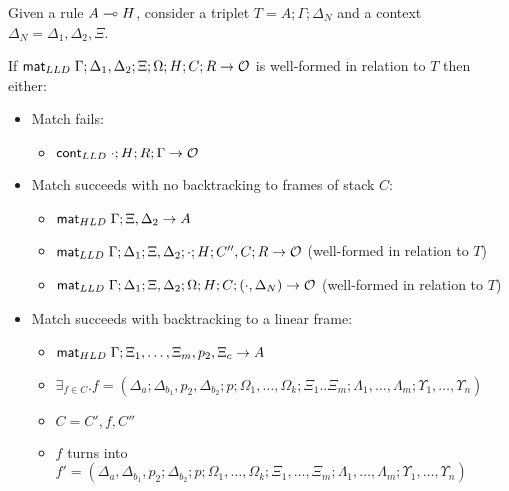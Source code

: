 \begin{lemma}\label{thm:body_match}
   
Given a rule $A \multimap H$, consider a triplet $T = A; \Gamma; \Delta_{N}$ and a context $\Delta_{N} = \Delta_1, \Delta_2, \Xi$.

If $\mathsf{mat}_{LLD} \; \Gamma; \Delta_1, \Delta_2; \Xi; \Omega; H; C; R \rightarrow \mathcal{O}$ is well-formed in relation to $T$ then either:

\begin{itemize}[leftmargin=*]
   \item Match fails:
   \begin{itemize}[leftmargin=\secondm]
      \item $\mathsf{cont}_{LLD} \; \cdot; H; R; \Gamma \rightarrow \mathcal{O}$
   \end{itemize}

   \item Match succeeds with no backtracking to frames of stack $C$:
   \begin{itemize}[leftmargin=\secondm]
      \item $\mathsf{mat}_{HLD} \; \Gamma; \Xi, \Delta_2 \rightarrow A$
      \item $\mathsf{mat}_{LLD} \; \Gamma; \Delta_1; \Xi, \Delta_2; \cdot; H; C'', C; R
         \rightarrow \mathcal{O}$ (well-formed in relation to $T$)
      \item $\mathsf{mat}_{LLD} \; \Gamma; \Delta_1; \Xi, \Delta_2; \Omega; H; C; (\cdot, \Delta_N) \rightarrow \mathcal{O}$ (well-formed in relation to $T$)
   \end{itemize}

   \item Match succeeds with backtracking to a linear frame:
   \begin{itemize}[leftmargin=\secondm]
      \item $\mathsf{mat}_{HLD} \; \Gamma; \Xi_1, \dotsc, \Xi_m, p_2, \Xi_c \rightarrow A$
      \item $\exists_{f \in C}. f = (\Delta_a; \Delta_{b_1}, p_2, \Delta_{b_2}; p;
            \Omega_1, \dotsc, \Omega_k; \Xi_1 .. \Xi_m; \Lambda_1, \dotsc,
            \Lambda_m; \Upsilon_1, \dotsc, \Upsilon_n)$

      \item $C = C', f, C''$

      \item $f$ turns into $f' = (\Delta_a, \Delta_{b_1}, p_2;
            \Delta_{b_2}; p; \Omega_1, \dotsc, \Omega_k; \Xi_1, \dotsc, \Xi_m;
            \Lambda_1, \dotsc, \Lambda_m; \Upsilon_1, \dotsc, \Upsilon_n)$


\end{itemize}
\end{itemize}
\end{lemma}
